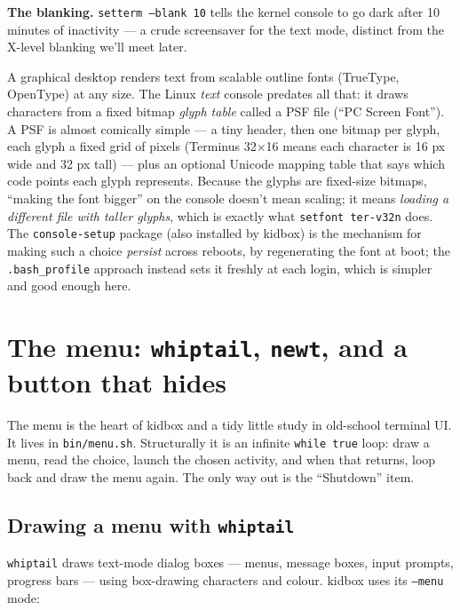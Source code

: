 \documentclass[11pt,oneside]{article}
\newcommand{\code}[1]{\texorpdfstring{\textcolor{kbblue}{\texttt{#1}}}{#1}}
\newcommand{\file}[1]{\textcolor{kbteal}{\texttt{#1}}}
\begin{document}
\textbf{The blanking.} \code{setterm --blank 10} tells the kernel console to go
dark after 10 minutes of inactivity --- a crude screensaver for the text mode,
distinct from the X-level blanking we'll meet later.

\begin{deeper}
A graphical desktop renders text from scalable outline fonts (TrueType,
OpenType) at any size. The Linux \emph{text} console predates all that: it draws
characters from a fixed bitmap \emph{glyph table} called a PSF file (``PC Screen
Font''). A PSF is almost comically simple --- a tiny header, then one bitmap per
glyph, each glyph a fixed grid of pixels (Terminus 32$\times$16 means each
character is 16 px wide and 32 px tall) --- plus an optional Unicode mapping
table that says which code points each glyph represents. Because the glyphs are
fixed-size bitmaps, ``making the font bigger'' on the console doesn't mean
scaling; it means \emph{loading a different file with taller glyphs}, which is
exactly what \texttt{setfont ter-v32n} does. The \texttt{console-setup} package
(also installed by kidbox) is the mechanism for making such a choice
\emph{persist} across reboots, by regenerating the font at boot; the
\file{.bash\_profile} approach instead sets it freshly at each login, which is
simpler and good enough here.
\end{deeper}

\section{The menu: \texttt{whiptail}, \texttt{newt}, and a button that hides}

The menu is the heart of kidbox and a tidy little study in old-school terminal
UI. It lives in \file{bin/menu.sh}. Structurally it is an infinite
\code{while true} loop: draw a menu, read the choice, launch the chosen
activity, and when that returns, loop back and draw the menu again. The only way
out is the ``Shutdown'' item.

\subsection{Drawing a menu with \texttt{whiptail}}

\texttt{whiptail} draws text-mode dialog boxes --- menus, message boxes, input
prompts, progress bars --- using box-drawing characters and colour. kidbox uses
its \code{--menu} mode:
\end{document}
